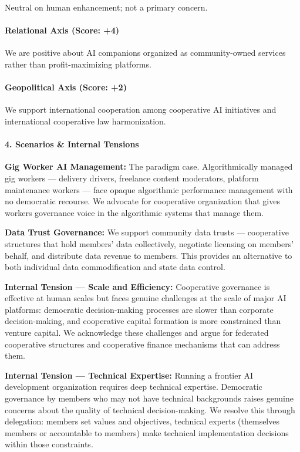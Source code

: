 Neutral on human enhancement; not a primary concern.

\paragraph{Relational Axis (Score: +4)}\label{relational-axis-score-4-1}

We are positive about AI companions organized as community-owned
services rather than profit-maximizing platforms.

\paragraph{Geopolitical Axis (Score:
+2)}\label{geopolitical-axis-score-2-4}

We support international cooperation among cooperative AI initiatives
and international cooperative law harmonization.

\paragraph{4. Scenarios \& Internal
Tensions}\label{scenarios-internal-tensions-30}

\textbf{Gig Worker AI Management:} The paradigm case. Algorithmically
managed gig workers --- delivery drivers, freelance content moderators,
platform maintenance workers --- face opaque algorithmic performance
management with no democratic recourse. We advocate for cooperative
organization that gives workers governance voice in the algorithmic
systems that manage them.

\textbf{Data Trust Governance:} We support community data trusts ---
cooperative structures that hold members' data collectively, negotiate
licensing on members' behalf, and distribute data revenue to members.
This provides an alternative to both individual data commodification and
state data control.

\textbf{Internal Tension --- Scale and Efficiency:} Cooperative
governance is effective at human scales but faces genuine challenges at
the scale of major AI platforms: democratic decision-making processes
are slower than corporate decision-making, and cooperative capital
formation is more constrained than venture capital. We acknowledge these
challenges and argue for federated cooperative structures and
cooperative finance mechanisms that can address them.

\textbf{Internal Tension --- Technical Expertise:} Running a frontier AI
development organization requires deep technical expertise. Democratic
governance by members who may not have technical backgrounds raises
genuine concerns about the quality of technical decision-making. We
resolve this through delegation: members set values and objectives,
technical experts (themselves members or accountable to members) make
technical implementation decisions within those constraints.


